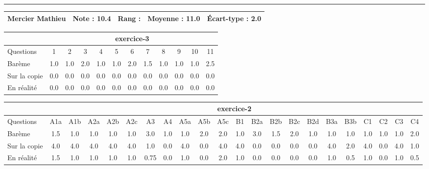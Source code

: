 \documentclass[a4paper, landscape, 10pt]{article}
\begin{document}
\begin{minipage}{\textwidth}
  \end{minipage}
  \vspace{0.3cm}
  \hrule
  \vspace{0.3cm}

  \begin{minipage}{\textwidth}
    { \bf
    \begin{tabular}{|c|*{4}{c|}}
    \hline
      Mercier Mathieu & Note : 10.4 & Rang :  & Moyenne : 11.0 & \'Ecart-type : 2.0 \\
    \hline
    \end{tabular}
    }
    
      \begin{tabular}{|l|*{ 11 }{c|}}
        \hline
        & \multicolumn{ 11 }{c|}{ exercice-3 } \\
        \hline
        Questions & 1&2&3&4&5&6&7&8&9&10&11 \\
        \hline
        Barème & 1.0&1.0&2.0&1.0&1.0&2.0&1.5&1.0&1.0&1.0&2.5 \\
        \hline
        Sur la copie & 0.0&0.0&0.0&0.0&0.0&0.0&0.0&0.0&0.0&0.0&0.0 \\
        \hline
        En réalité & 0.0&0.0&0.0&0.0&0.0&0.0&0.0&0.0&0.0&0.0&0.0 \\
        \hline
      \end{tabular}
    
      \begin{tabular}{|l|*{ 21 }{c|}}
        \hline
        & \multicolumn{ 21 }{c|}{ exercice-2 } \\
        \hline
        Questions & A1a&A1b&A2a&A2b&A2c&A3&A4&A5a&A5b&A5c&B1&B2a&B2b&B2c&B2d&B3a&B3b&C1&C2&C3&C4 \\
        \hline
        Barème & 1.5&1.0&1.0&1.0&1.0&3.0&1.0&1.0&2.0&2.0&1.0&3.0&1.5&2.0&1.0&1.0&1.0&1.0&1.0&1.0&2.0 \\
        \hline
        Sur la copie & 4.0&4.0&4.0&4.0&4.0&1.0&0.0&4.0&0.0&4.0&4.0&0.0&0.0&0.0&0.0&4.0&2.0&4.0&0.0&4.0&1.0 \\
        \hline
        En réalité & 1.5&1.0&1.0&1.0&1.0&0.75&0.0&1.0&0.0&2.0&1.0&0.0&0.0&0.0&0.0&1.0&0.5&1.0&0.0&1.0&0.5 \\
        \hline
      \end{tabular}
    

\end{minipage}
\end{document}
